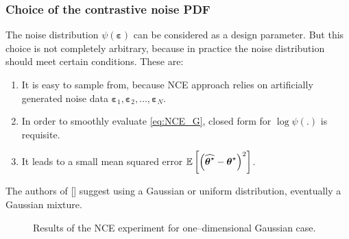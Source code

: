 \subsubsection{Choice of the contrastive noise PDF}
The noise distribution $\psi\left(\boldsymbol{\varepsilon}\right)$ can be considered as a design parameter. But this choice is not completely arbitrary, because in practice the noise distribution should meet certain conditions. These are:
\begin{enumerate}
    \item It is easy to sample from, because NCE approach relies on artificially generated noise data $\boldsymbol{\varepsilon}_1,\boldsymbol{\varepsilon}_2,\dots,\boldsymbol{\varepsilon}_N$. 
    \item In order to smoothly evaluate \eqref{eq:NCE_G}, closed form for $\log\psi\left(. \right)$ is requisite.
    \item It leads to a small mean squared error $\mathbb{E}\left[\left(\widehat{\boldsymbol{\theta}^\star} - \boldsymbol{\theta}^\star\right)^2\right]$.
\end{enumerate}
The authors of [] suggest using a Gaussian or uniform distribution, eventually a Gaussian mixture. 
\begin{example}
\begin{figure}[h]
	\centering
	\caption{Results of the NCE experiment for one--dimensional Gaussian case.}%
	\label{ex:NCE_1}%
\end{figure}
\end{example}
